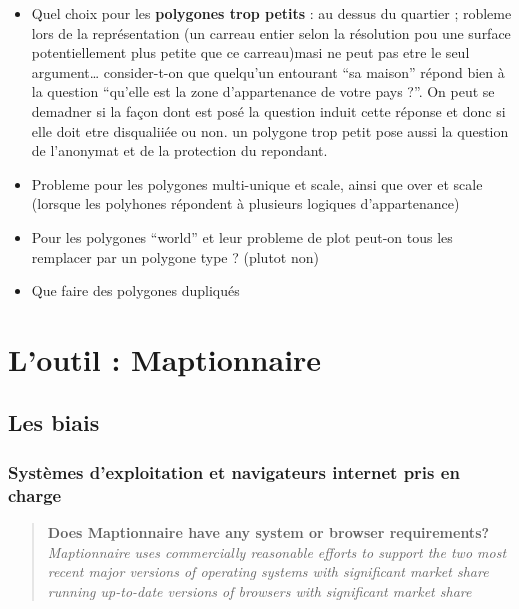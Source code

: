 \documentclass[
  12pt,
  a4paper,
]{scrbook}
\begin{document}
\begin{itemize}
\item
  Quel choix pour les \textbf{polygones trop petits} : au dessus du
  quartier ; robleme lors de la représentation (un carreau entier selon
  la résolution pou une surface potentiellement plus petite que ce
  carreau)masi ne peut pas etre le seul argument\ldots{} consider-t-on
  que quelqu'un entourant ``sa maison'' répond bien à la question
  ``qu'elle est la zone d'appartenance de votre pays ?''. On peut se
  demadner si la façon dont est posé la question induit cette réponse et
  donc si elle doit etre disqualiiée ou non. un polygone trop petit pose
  aussi la question de l'anonymat et de la protection du repondant.
\item
  Probleme pour les polygones multi-unique et scale, ainsi que over et
  scale (lorsque les polyhones répondent à plusieurs logiques
  d'appartenance)
\item
  Pour les polygones ``world'' et leur probleme de plot peut-on tous les
  remplacer par un polygone type ? (plutot non)
\item
  Que faire des polygones dupliqués
\end{itemize}

\hypertarget{loutil-maptionnaire}{%
\section{L'outil : Maptionnaire}\label{loutil-maptionnaire}}

\hypertarget{les-biais}{%
\subsection{Les biais}\label{les-biais}}

\hypertarget{systuxe8mes-dexploitation-et-navigateurs-internet-pris-en-charge}{%
\subsubsection{Systèmes d'exploitation et navigateurs internet pris en
charge}\label{systuxe8mes-dexploitation-et-navigateurs-internet-pris-en-charge}}

\begin{quote}
\textbf{Does Maptionnaire have any system or browser requirements?}
\emph{Maptionnaire uses commercially reasonable efforts to support the
two most recent major versions of operating systems with significant
market share running up-to-date versions of browsers with significant
market share}
\end{quote}
\end{document}
